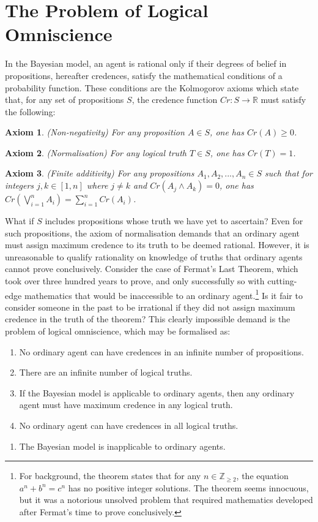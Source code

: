 \documentclass[12pt]{article}
\newtheorem{axiom}{Axiom}
\begin{document}
\section{The Problem of Logical Omniscience}
In the Bayesian model, an agent is rational only if their degrees of belief in propositions, hereafter credences, satisfy the mathematical conditions of a probability function.\autocite[13]{bdrc} These conditions are the Kolmogorov axioms which state that, for any set of propositions $S$, the credence function $Cr:S\rightarrow\mathbb{R}$ must satisfy the following:
\begin{axiom}
    (Non-negativity) For any proposition $A\in S$, one has $Cr(A)\geq0$.
\end{axiom}
\begin{axiom}
    (Normalisation) For any logical truth $T\in S$, one has $Cr(T)=1$.
\end{axiom}
\begin{axiom}
    (Finite additivity) For any propositions $A_1, A_2, ..., A_n\in S$ such that for integers $j,k\in[1,n]$ where $j\neq k$ and $Cr(A_j\land A_k)=0$, one has $Cr(\bigvee_{i=1}^{n}A_i)=\sum_{i=1}^{n}Cr(A_i)$.
\end{axiom}
What if $S$ includes propositions whose truth we have yet to ascertain? Even for such propositions, the axiom of normalisation demands that an ordinary agent must assign maximum credence to its truth to be deemed rational. However, it is unreasonable to qualify rationality on knowledge of truths that ordinary agents cannot prove conclusively. Consider the case of Fermat's Last Theorem, which took over three hundred years to prove, and only successfully so with cutting-edge mathematics that would be inaccessible to an ordinary agent.\footnote{For background, the theorem states that for any $n\in\mathbb{Z}_{\geq2}$, the equation $a^n+b^n=c^n$ has no positive integer solutions. The theorem seems innocuous, but it was a notorious unsolved problem that required mathematics developed after Fermat's time to prove conclusively.} Is it fair to consider someone in the past to be irrational if they did not assign maximum credence in the truth of the theorem?\autocite[108]{dogramaci} This clearly impossible demand is the problem of logical omniscience, which may be formalised as:\autocite{youtube}
\begin{enumerate}[label=\textbf{P\arabic*:},leftmargin=0.5in]
    \item No ordinary agent can have credences in an infinite number of propositions.
    \item There are an infinite number of logical truths.
    \item If the Bayesian model is applicable to ordinary agents, then any ordinary agent must have maximum credence in any logical truth.
    \item No ordinary agent can have credences in all logical truths.
\end{enumerate}
\begin{enumerate}[resume,label=\textbf{C:}, topsep=0pt, leftmargin=0.5in]
    \item The Bayesian model is inapplicable to ordinary agents.
\end{enumerate}
\end{document}
